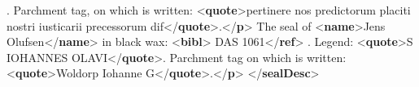 \begin{shaded}
\hspace*{1em}\hspace*{1em}. Parchment tag, on which is written: {<\textbf{quote}>}pertinere nos\mbox{}\newline 
\hspace*{1em}\hspace*{1em}\hspace*{1em}\hspace*{1em}\hspace*{1em}\hspace*{1em} predictorum placiti nostri iusticarii precessorum dif{</\textbf{quote}>}.{</\textbf{p}>}\mbox{}\newline 
{}\mbox{}\newline 
{}\mbox{}\newline 
\hspace*{1em}The seal of {<\textbf{name}>}Jens Olufsen{</\textbf{name}>} in black wax: {<\textbf{bibl}>}\mbox{}\newline 
\hspace*{1em}\hspace*{1em}\hspace*{1em}DAS\mbox{}\newline 
\hspace*{1em}\hspace*{1em}\hspace*{1em}\hspace*{1em}\hspace*{1em}\hspace*{1em}\hspace*{1em}\hspace*{1em} 1061{</\textbf{ref}>}\mbox{}\newline 
\hspace*{1em}\hspace*{1em}. Legend: {<\textbf{quote}>}S IOHANNES OLAVI{</\textbf{quote}>}. Parchment tag on\mbox{}\newline 
\hspace*{1em}\hspace*{1em}\hspace*{1em}\hspace*{1em} which is written: {<\textbf{quote}>}Woldorp Iohanne G{</\textbf{quote}>}.{</\textbf{p}>}\mbox{}\newline 
{}\mbox{}\newline 
{</\textbf{sealDesc}>}\end{shaded}\egroup\par 
